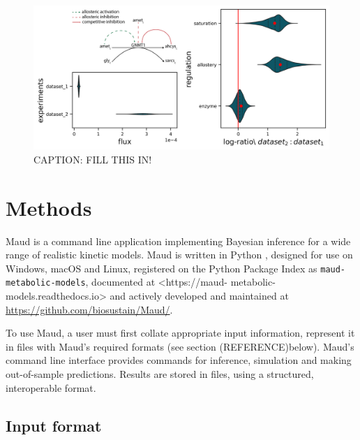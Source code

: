 \documentclass[journal=,manuscript=]{achemso}
\begin{document}
\begin{figure}

{\centering \includegraphics{./figures/decomposition.png}

}

\caption{\label{fig-decomposition}CAPTION: FILL THIS IN!}

\end{figure}

\hypertarget{methods}{%
\section{Methods}\label{methods}}

Maud is a command line application implementing Bayesian inference for a
wide range of realistic kinetic models. Maud is written in Python
\citep{vanrossumPythonReferenceManual2009}, designed for use on Windows,
macOS and Linux, registered on the Python Package Index as
\texttt{maud-metabolic-models}, documented at \textless https://maud-
metabolic-models.readthedocs.io\textgreater{} and actively developed and
maintained at \url{https://github.com/biosustain/Maud/}.

To use Maud, a user must first collate appropriate input information,
represent it in files with Maud's required formats (see section
(REFERENCE)below). Maud's command line interface provides commands for
inference, simulation and making out-of-sample predictions. Results are
stored in files, using a structured, interoperable format.

\hypertarget{input-format}{%
\subsection{Input format}\label{input-format}}
\end{document}
